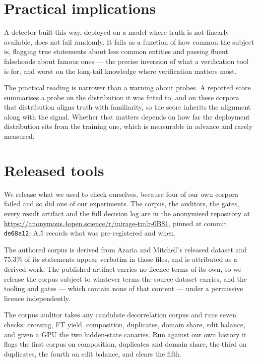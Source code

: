 \documentclass[10pt]{article}
\begin{document}
\section{Practical implications}

A detector built this way, deployed on a model where truth is not linearly available, does not fail randomly. It fails as a function of how common the subject is, flagging true statements about less common entities and passing fluent falsehoods about famous ones --- the precise inversion of what a verification tool is for, and worst on the long-tail knowledge where verification matters most.

The practical reading is narrower than a warning about probes. A reported score summarises a probe on the distribution it was fitted to, and on these corpora that distribution aligns truth with familiarity, so the score inherits the alignment along with the signal. Whether that matters depends on how far the deployment distribution sits from the training one, which is measurable in advance and rarely measured.

\section{Released tools}

We release what we used to check ourselves, because four of our own corpora failed and so did one of our experiments. The corpus, the auditors, the gates, every result artifact and the full decision log are in the anonymised repository at \url{https://anonymous.4open.science/r/mirage-tmlr-0B81}, pinned at commit \texttt{de68a12}; A.5 records what was pre-registered and when.

The authored corpus is derived from Azaria and Mitchell's released dataset and 75.3\% of its statements appear verbatim in those files, and is attributed as a derived work. The published artifact carries no licence terms of its own, so we release the corpus subject to whatever terms the source dataset carries, and the tooling and gates --- which contain none of that content --- under a permissive licence independently.

The corpus auditor takes any candidate decorrelation corpus and runs seven checks: crossing, FT yield, composition, duplicates, domain share, edit balance, and given a GPU the two hidden-state canaries. Run against our own history it flags the first corpus on composition, duplicates and domain share, the third on duplicates, the fourth on edit balance, and clears the fifth. 
\end{document}
